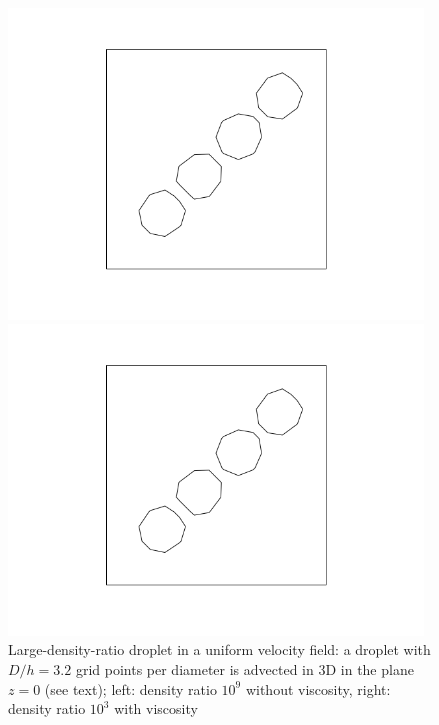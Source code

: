 \begin{figure}
\centering
\begin{minipage}{0.48\textwidth}
\centering
\includegraphics[width=0.98\textwidth]{Figures/cylinderadvection.png}
\end{minipage}
\begin{minipage}{0.48\textwidth}
\centering
\includegraphics[width=0.98\textwidth]{Figures/cylinderadvectionviscous.png}
\end{minipage}
\caption{Large-density-ratio droplet in a uniform velocity field: a droplet 
with $D/h=3.2$ grid points per diameter is advected in 3D in the plane $z=0$ 
(see text); left:  density ratio $10^9$ without viscosity,
right: density ratio $10^3$ with viscosity}
\label{CylAdv}
\end{figure}

